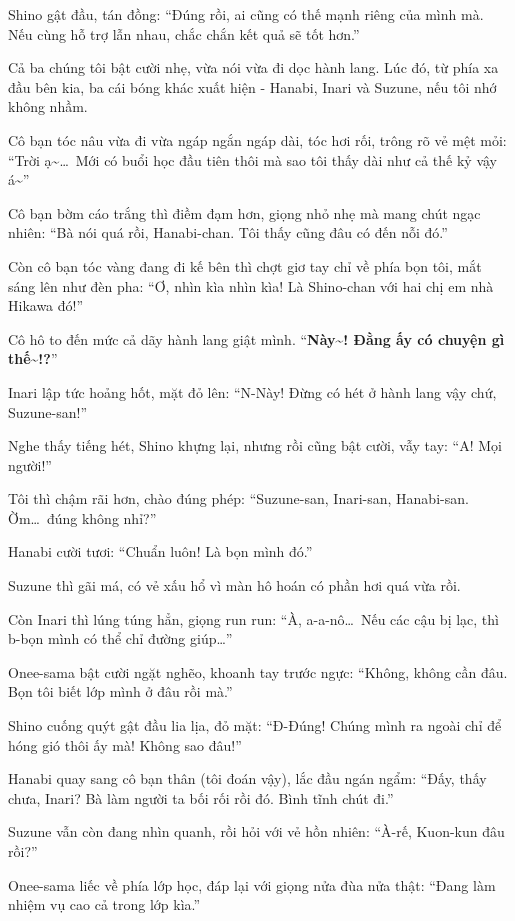 \documentclass[../main.tex]{subfiles}
\begin{document}
Shino gật đầu, tán đồng: ``Đúng rồi, ai cũng có thế mạnh riêng của mình mà. Nếu cùng hỗ trợ lẫn nhau, chắc chắn kết quả sẽ tốt hơn.''

Cả ba chúng tôi bật cười nhẹ, vừa nói vừa đi dọc hành lang. Lúc đó, từ phía xa đầu bên kia, ba cái bóng khác xuất hiện - Hanabi, Inari và Suzune, nếu tôi nhớ không nhầm.


Cô bạn tóc nâu vừa đi vừa ngáp ngắn ngáp dài, tóc hơi rối, trông rõ vẻ mệt mỏi: ``Trời ạ\~{}\dots\ Mới có buổi học đầu tiên thôi mà sao tôi thấy dài như cả thế kỷ vậy á\~{}''

Cô bạn bờm cáo trắng thì điềm đạm hơn, giọng nhỏ nhẹ mà mang chút ngạc nhiên: ``Bà nói quá rồi, Hanabi-chan. Tôi thấy cũng đâu có đến nỗi đó.''

Còn cô bạn tóc vàng đang đi kế bên thì chợt giơ tay chỉ về phía bọn tôi, mắt sáng lên như đèn pha: ``Ơ, nhìn kìa nhìn kìa! Là Shino-chan với hai chị em nhà Hikawa đó!''

Cô hô to đến mức cả dãy hành lang giật mình. ``\textbf{Này\~{}! Đằng ấy có chuyện gì thế\~{}!?}''

Inari lập tức hoảng hốt, mặt đỏ lên: ``N-Này! Đừng có hét ở hành lang vậy chứ, Suzune-san!''

Nghe thấy tiếng hét, Shino khựng lại, nhưng rồi cũng bật cười, vẫy tay: ``A! Mọi người!''

Tôi thì chậm rãi hơn, chào đúng phép: ``Suzune-san, Inari-san, Hanabi-san. Ờm\dots\ đúng không nhỉ?''

Hanabi cười tươi: ``Chuẩn luôn! Là bọn mình đó.''

Suzune thì gãi má, có vẻ xấu hổ vì màn hô hoán có phần hơi quá vừa rồi.

Còn Inari thì lúng túng hẳn, giọng run run: ``À, a-a-nô\dots\ Nếu các cậu bị lạc, thì b-bọn mình có thể chỉ đường giúp\dots''

Onee-sama bật cười ngặt nghẽo, khoanh tay trước ngực: ``Không, không cần đâu. Bọn tôi biết lớp mình ở đâu rồi mà.''

Shino cuống quýt gật đầu lia lịa, đỏ mặt: ``Đ-Đúng! Chúng mình ra ngoài chỉ để hóng gió thôi ấy mà! Không sao đâu!''

Hanabi quay sang cô bạn thân (tôi đoán vậy), lắc đầu ngán ngẩm: ``Đấy, thấy chưa, Inari? Bà làm người ta bối rối rồi đó. Bình tĩnh chút đi.''

Suzune vẫn còn đang nhìn quanh, rồi hỏi với vẻ hồn nhiên: ``À-rế, Kuon-kun đâu rồi?''

Onee-sama liếc về phía lớp học, đáp lại với giọng nửa đùa nửa thật: ``Đang làm nhiệm vụ cao cả trong lớp kìa.''
\end{document}
